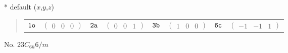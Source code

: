\documentclass[fleqn,9pt,landscape]{jsarticle}
\begin{document}
* default ($x$,$y$,$z$)
\begin{quote}
\begin{tabular}{cccccccc}
$ {\tt 1o} $ & $ \begin{pmatrix} 0 & 0 & 0 \end{pmatrix} $ & $ {\tt 2a} $ & $ \begin{pmatrix} 0 & 0 & 1 \end{pmatrix} $ & $ {\tt 3b} $ & $ \begin{pmatrix} 1 & 0 & 0 \end{pmatrix} $ & $ {\tt 6c} $ & $ \begin{pmatrix} -1 & -1 & 1 \end{pmatrix} $
\end{tabular}
\end{quote}
\newpage
No. 23\quad$C_{6h}$\quad$6/m$\quad[ hexagonal ]
\end{document}
